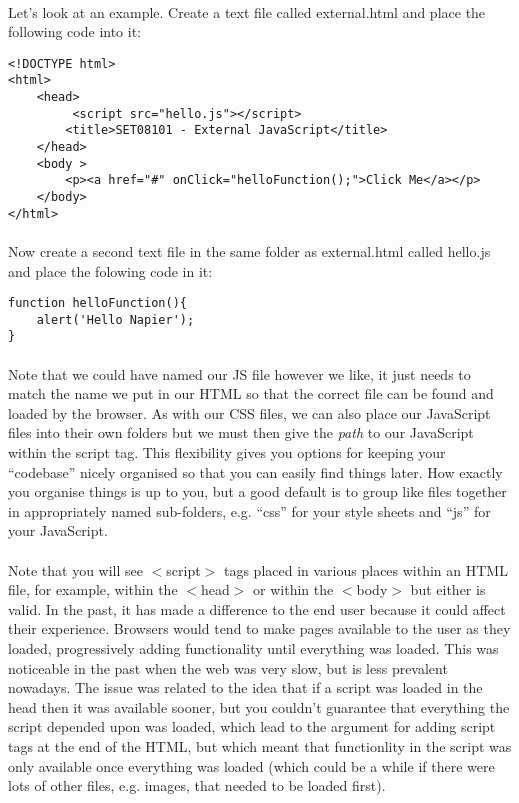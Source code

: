 \documentclass[10pt, a4paper, twosize]{article}
\begin{document}
\paragraph{} Let's look at an example. Create a text file called external.html and place the following code into it:

\begin{lstlisting}
<!DOCTYPE html>
<html>
    <head>
         <script src="hello.js"></script> 
        <title>SET08101 - External JavaScript</title>
    </head>
    <body >
        <p><a href="#" onClick="helloFunction();">Click Me</a></p>
    </body>
</html>
\end{lstlisting}

\paragraph{} Now create a second text file in the same folder as external.html called hello.js and place the folowing code in it:

\begin{lstlisting}
function helloFunction(){ 
    alert('Hello Napier'); 
}
\end{lstlisting}

\paragraph{} Note that we could have named our JS file however we like, it just needs to match the name we put in our HTML so that the correct file can be found and loaded by the browser. As with our CSS files, we can also place our JavaScript files into their own folders but we must then give the \emph{path} to our JavaScript within the script tag. This flexibility gives you options for keeping your ``codebase'' nicely organised so that you can easily find things later. How exactly you organise things is up to you, but a good default is to group like files together in appropriately named sub-folders, e.g. ``css'' for your style sheets and ``js'' for your JavaScript.

\paragraph{} Note that you will see $<$script$>$ tags placed in various places within an HTML file, for example, within the $<$head$>$ or within the $<$body$>$ but either is valid. In the past, it has made a difference to the end user because it could affect their experience. Browsers would tend to make pages available to the user as they loaded, progressively adding functionality until everything was loaded. This was noticeable in the past when the web was very slow, but is less prevalent nowadays. The issue was related to the idea that if a script was loaded in the head then it was available sooner, but you couldn't guarantee that everything the script depended upon was loaded, which lead to the argument for adding script tags at the end of the HTML, but which meant that functionlity in the script was only available once everything was loaded (which could be a while if there were lots of other files, e.g. images, that needed to be loaded first).
\end{document}

